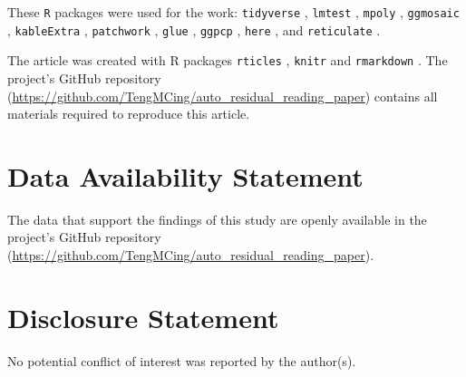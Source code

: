 \documentclass[]{interact}
\theoremstyle{plain}%
\theoremstyle{definition}
\theoremstyle{remark}
\begin{document}
These \texttt{R} packages were used for the work: \texttt{tidyverse}
\citep{tidyverse}, \texttt{lmtest} \citep{lmtest}, \texttt{mpoly}
\citep{mpoly}, \texttt{ggmosaic} \citep{ggmosaic}, \texttt{kableExtra}
\citep{kableextra}, \texttt{patchwork} \citep{patchwork}, \texttt{glue}
\citep{glue}, \texttt{ggpcp} \citep{ggpcp}, \texttt{here} \citep{here},
and \texttt{reticulate} \citep{reticulate}.

The article was created with R packages \texttt{rticles}
\citep{rticles}, \texttt{knitr} \citep{knitr} and \texttt{rmarkdown}
\citep{rmarkdown}. The project's GitHub repository
(\url{https://github.com/TengMCing/auto_residual_reading_paper})
contains all materials required to reproduce this article.

\section*{Data Availability
Statement}\label{data-availability-statement}

The data that support the findings of this study are openly available in
the project's GitHub repository
(\url{https://github.com/TengMCing/auto_residual_reading_paper}).

\section*{Disclosure Statement}\label{disclosure-statement}

No potential conflict of interest was reported by the author(s).



\end{document}
